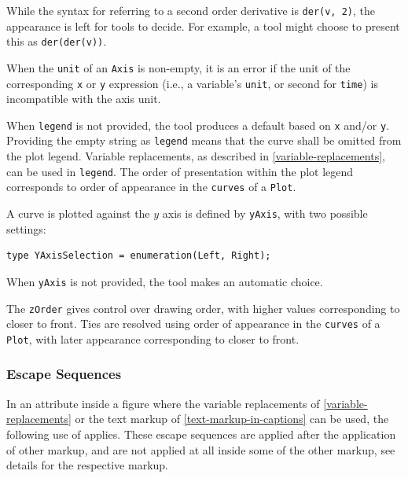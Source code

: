 \begin{nonnormative}
While the syntax for referring to a second order derivative is \lstinline!der(v, 2)!, the appearance is left for tools to decide.
For example, a tool might choose to present this as \lstinline!der(der(v))!.
\end{nonnormative}

When the \lstinline!unit! of an \lstinline!Axis! is non-empty, it is an error if the unit of the corresponding \lstinline!x! or \lstinline!y! expression (i.e., a variable's \lstinline!unit!, or second for \lstinline!time!) is incompatible with the axis unit.

When \lstinline!legend! is not provided, the tool produces a default based on \lstinline!x! and/or \lstinline!y!.
Providing the empty string as \lstinline!legend! means that the curve shall be omitted from the plot legend.
Variable replacements, as described in \cref{variable-replacements}, can be used in \lstinline!legend!.
The order of presentation within the plot legend corresponds to order of appearance in the \lstinline!curves! of a \lstinline!Plot!.

A curve is plotted against the $y$ axis is defined by \lstinline!yAxis!, with two possible settings:
\begin{lstlisting}[language=modelica]
type YAxisSelection = enumeration(Left, Right);
\end{lstlisting}%
When \lstinline!yAxis! is not provided, the tool makes an automatic choice.

The \lstinline!zOrder! gives control over drawing order, with higher values corresponding to closer to front.
Ties are resolved using order of appearance in the \lstinline!curves! of a \lstinline!Plot!, with later appearance corresponding to closer to front.

\subsubsection{Escape Sequences}\label{text-markup-escape-sequences}

In an attribute inside a figure where the variable replacements of \cref{variable-replacements} or the text markup of \cref{text-markup-in-captions} can be used, the following use of  applies.
These escape sequences are applied after the application of other markup, and are not applied at all inside some of the other markup, see details for the respective markup.

